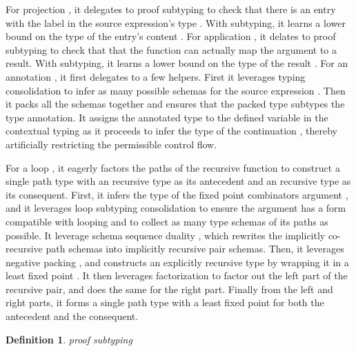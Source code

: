 \documentclass[table,dvipsnames,acmsmall]{acmart}
\theoremstyle{definition}
\newtheorem{definition}{Definition}[section]
\begin{document}
For projection , 
it delegates to proof subtyping 
to check that there is an entry with the label 
in the source expression's type \ms{\tau}.
With subtyping, it learns a lower bound on the type of the entry's content \ms{\alpha}.
For application , 
it delates to proof subtyping 
to check that that the function  can actually
map the argument  to a result. With subtyping, 
it learns a lower bound on the type of the result \ms{\alpha}.
For an annotation , 
it first delegates to a few helpers. 
First it leverages typing consolidation 
to infer as many possible schemas for the source expression .
Then it packs all the schemas together and ensures that the packed type
subtypes the type annotation.
It assigns the annotated type to the defined variable in the contextual typing
as it proceeds to infer the type of the continuation , thereby
artificially restricting the permissible control flow. 


For a loop , 
it eagerly factors the paths of the recursive function 
to construct a single path type 
with an recursive type as its antecedent and an recursive type as its consequent. 
First, it infers the type of the fixed point combinators argument ,
and it leverages loop subtyping consolidation 
to ensure the argument has a  
form compatible with looping and 
to collect as many type schemas of its paths as possible.  
It leverage schema sequence duality 
\ms{
  \alpha_\nu \downarrow \Pi_\nu
  \fallingdotseq 
  \alpha_\mu \uparrow \Pi_\mu
}, which rewrites the implicitly co-recursive path schemas into
implicitly recursive pair schemas. 
Then, it leverages negative packing ,
and constructs an explicitly recursive type by wrapping it in a least fixed point
.
It then leverages factorization  to factor out the left part of the recursive pair, and does the same for the right part. 
Finally from the left and right parts, it forms a single path type
with a least fixed point for both the antecedent and the consequent. 


\begin{definition} 
  \label{def:proof_subtyping}
  \emph{proof subtyping}
  \hfill
  \small
\end{definition}
\end{document}
